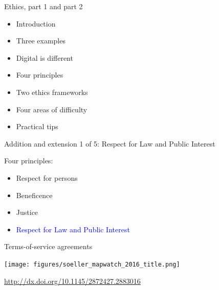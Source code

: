 \documentclass{beamer}
\begin{document}
\begin{frame}

Ethics, part 1 and part 2
\begin{itemize}
\item Introduction
\item Three examples
\item Digital is different
\item Four principles
\item Two ethics frameworks
\item Four areas of difficulty
\item Practical tips
\end{itemize}

\end{frame}
\begin{frame}

\begin{center}
Addition and extension 1 of 5: Respect for Law and Public Interest
\end{center}

\end{frame}
\begin{frame}

Four principles:
\begin{itemize}
\item Respect for persons
\item Beneficence
\item Justice
\item \textcolor{blue}{Respect for Law and Public Interest}
\end{itemize}

\end{frame}
\begin{frame}

Terms-of-service agreements

\end{frame}
\begin{frame}

\begin{center}
\texttt{[image: figures/soeller\_mapwatch\_2016\_title.png]}
\end{center}

\vfill
\url{http://dx.doi.org/10.1145/2872427.2883016}
\end{frame}
\end{document}
